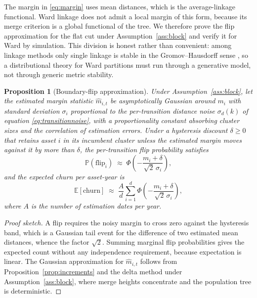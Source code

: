 \documentclass[11pt]{article}
\newtheorem{proposition}{Proposition}
\theoremstyle{remark}
\newcommand{\E}{\mathbb{E}}
\newcommand{\Prob}{\mathbb{P}}
\begin{document}
The margin in \eqref{eq:margin} uses mean distances, which is the
average-linkage functional. Ward linkage does not admit a local margin of this
form, because its merge criterion is a global functional of the tree. We
therefore prove the flip approximation for the flat cut under
Assumption~\ref{ass:block} and verify it for Ward by simulation. This division
is honest rather than convenient: among linkage methods only single linkage is
stable in the Gromov--Hausdorff sense \citep{carlsson2010characterization}, so
a distributional theory for Ward partitions must run through a generative
model, not through generic metric stability.

\begin{proposition}[Boundary-flip approximation]
\label{prop:flip}
Under Assumption~\ref{ass:block}, let the estimated margin statistic
$\widehat{m}_{i,t}$ be asymptotically Gaussian around $m_i$ with standard
deviation $\sigma_i$ proportional to the per-transition distance noise
$\sigma_d(k)$ of equation \eqref{eq:transitionnoise}, with a proportionality
constant absorbing cluster sizes and the correlation of estimation errors.
Under a hysteresis discount $\delta \geq 0$ that retains asset $i$ in its
incumbent cluster unless the estimated margin moves against it by more than
$\delta$, the per-transition flip probability satisfies
\begin{equation}
\Prob\!\left(\text{flip}_i\right)
\;\approx\; \Phi\!\left( - \frac{m_i + \delta}{\sqrt{2}\,\sigma_i} \right),
\label{eq:flipprob}
\end{equation}
and the expected churn per asset-year is
\begin{equation}
\E\!\left[\text{churn}\right]
\;\approx\; \frac{A}{d} \sum_{i=1}^{d}
\Phi\!\left( - \frac{m_i + \delta}{\sqrt{2}\,\sigma_i} \right),
\label{eq:expectedchurn}
\end{equation}
where $A$ is the number of estimation dates per year.
\end{proposition}

\begin{proof}[Proof sketch]
A flip requires the noisy margin to cross zero against the hysteresis band,
which is a Gaussian tail event for the difference of two estimated mean
distances, whence the factor $\sqrt{2}$. Summing marginal flip probabilities
gives the expected count without any independence requirement, because
expectation is linear. The Gaussian approximation for $\widehat{m}_{i,t}$
follows from Proposition~\ref{prop:increments} and the delta method under
Assumption~\ref{ass:block}, where merge heights concentrate and the population
tree is deterministic.
\end{proof}
\end{document}

